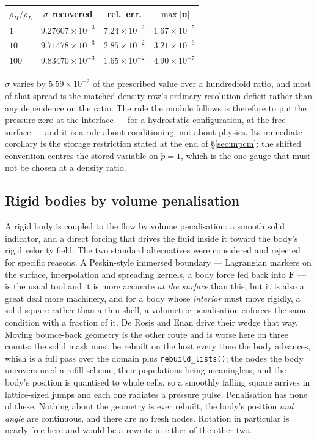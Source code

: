 \documentclass[11pt,a4paper]{article}
\newcommand{\code}[1]{\texttt{\small #1}}
\newcommand{\uu}{\bm{u}}
\newcommand{\e}[1]{\times 10^{#1}}
\begin{document}
\begin{center}\small
\begin{tabular}{lccc}
\toprule
$\rho_H/\rho_L$ & $\sigma$ recovered & rel.\ err. & $\max|\uu|$ \\
\midrule
$1$   & $9.27607\e{-3}$ & $7.24\e{-2}$ & $1.67\e{-5}$ \\
$10$  & $9.71478\e{-3}$ & $2.85\e{-2}$ & $3.21\e{-6}$ \\
$100$ & $9.83470\e{-3}$ & $1.65\e{-2}$ & $4.90\e{-7}$ \\
\bottomrule
\end{tabular}
\end{center}

\noindent$\sigma$ varies by $5.59\e{-2}$ of the prescribed value over a hundredfold
ratio, and most of that spread is the matched-density row's ordinary resolution
deficit rather than any dependence on the ratio. The rule the module follows is
therefore to put the pressure zero at the interface --- for a hydrostatic
configuration, at the free surface --- and it is a rule about conditioning, not
about physics. Its immediate corollary is the storage restriction stated at the
end of \S\ref{sec:mpcm}: the shifted convention centres the stored variable on
$\tilde p = 1$, which is the one gauge that must not be chosen at a density ratio.

\subsection{Rigid bodies by volume penalisation}
\label{sec:penalisation}

A rigid body is coupled to the flow by volume penalisation: a smooth solid
indicator, and a direct forcing that drives the fluid inside it toward the body's
rigid velocity field. The two standard alternatives were considered and rejected
for specific reasons. A Peskin-style immersed boundary --- Lagrangian markers on
the surface, interpolation and spreading kernels, a body force fed back into
$\bm{F}$ --- is the usual tool and it is more accurate \emph{at the surface} than
this, but it is also a great deal more machinery, and for a body whose
\emph{interior} must move rigidly, a solid square rather than a thin shell, a
volumetric penalisation enforces the same condition with a fraction of it. De
Rosis and Enan drive their wedge that way. Moving bounce-back geometry is the
other route and is worse here on three counts: the solid mask must be rebuilt on
the host every time the body advances, which is a full pass over the domain plus
\code{rebuild\_lists()}; the nodes the body uncovers need a refill scheme, their
populations being meaningless; and the body's position is quantised to whole
cells, so a smoothly falling square arrives in lattice-sized jumps and each one
radiates a pressure pulse. Penalisation has none of these. Nothing about the
geometry is ever rebuilt, the body's position \emph{and angle} are continuous,
and there are no fresh nodes. Rotation in particular is nearly free here and
would be a rewrite in either of the other two.
\end{document}
